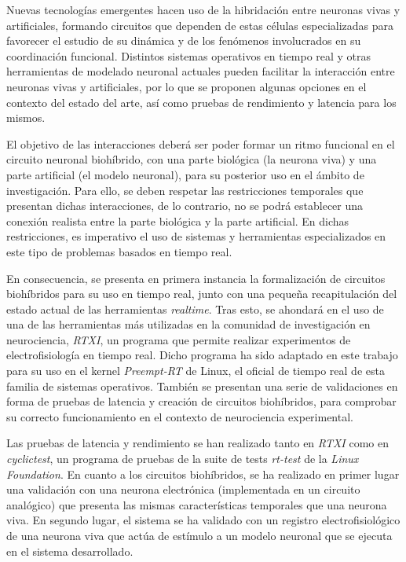 
Nuevas tecnologías emergentes hacen uso de la hibridación entre neuronas vivas y artificiales, formando circuitos que dependen de estas células especializadas para favorecer el estudio de su dinámica y de los fenómenos involucrados en su coordinación funcional. Distintos sistemas operativos en tiempo real y otras herramientas de modelado neuronal actuales pueden facilitar la interacción entre neuronas vivas y artificiales, por lo que se proponen algunas opciones en el contexto del estado del arte, así como pruebas de rendimiento y latencia para los mismos. 

El objetivo de las interacciones deberá ser poder formar un ritmo funcional en el circuito neuronal biohíbrido, con una parte biológica (la neurona viva) y una parte artificial (el modelo neuronal), para su posterior uso en el ámbito de investigación. Para ello, se deben respetar las restricciones temporales que presentan dichas interacciones, de lo contrario, no se podrá establecer una conexión realista entre la parte biológica y la parte artificial. En dichas restricciones, es imperativo el uso de sistemas y herramientas especializados en este tipo de problemas basados en tiempo real.

En consecuencia, se presenta en primera instancia la formalización de circuitos biohíbridos para su uso en tiempo real, junto con una pequeña recapitulación del estado actual de las herramientas \textit{realtime}. Tras esto, se ahondará en el uso de una de las herramientas más utilizadas en la comunidad de investigación en neurociencia, \textit{RTXI}, un programa que permite realizar experimentos de electrofisiología en tiempo real. Dicho programa ha sido adaptado en este trabajo para su uso en el kernel \textit{Preempt-RT} de Linux, el oficial de tiempo real de esta familia de sistemas operativos. También se presentan una serie de validaciones en forma de pruebas de latencia y creación de circuitos biohíbridos, para comprobar su correcto funcionamiento en el contexto de neurociencia experimental. 

Las pruebas de latencia y rendimiento se han realizado tanto en \textit{RTXI} como en \textit{cyclictest}, un programa de pruebas de la suite de tests \textit{rt-test} de la \textit{Linux Foundation}. En cuanto a los circuitos biohíbridos, se ha realizado en primer lugar una validación con una neurona electrónica (implementada en un circuito analógico) que presenta las mismas características temporales que una neurona viva. En segundo lugar, el sistema se ha validado con un registro electrofisiológico de una neurona viva que actúa de estímulo a un modelo neuronal que se ejecuta en el sistema desarrollado. 


